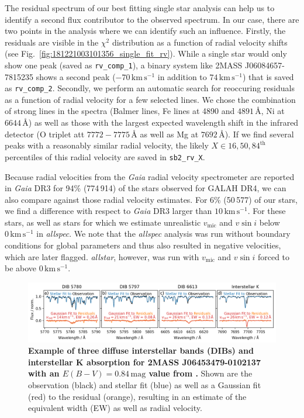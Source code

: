\documentclass[
  journal=pasa,
  manuscript=research-paper, %
  year=2023,
  volume=37
]{cup-journal}
\newcommand{\vmic}{$v_\mathrm{mic}$\xspace}
\newcommand{\vsini}{$v \sin i$\xspace}
\newcommand{\Gaia}{\textit{Gaia}\xspace}
\begin{document}
The residual spectrum of our best fitting single star analysis can help us to identify a second flux contributor to the observed spectrum. In our case, there are two points in the analysis where we can identify such an influence. Firstly, the residuals are visible in the $\chi^2$ distribution as a function of radial velocity shifts (see Fig.~\ref{fig:181221003101356_single_fit_rv}). While a single star would only show one peak (saved as \texttt{rv\_comp\_1}), a binary system like 2MASS J06084657-7815235 shows a second peak ($-70\,\mathrm{km\,s^{-1}}$ in addition to $74\,\mathrm{km\,s^{-1}}$) that is saved as \texttt{rv\_comp\_2}. Secondly, we perform an automatic search for reoccuring residuals as a function of radial velocity for a few selected lines. We chose the combination of strong lines in the spectra (Balmer lines, Fe lines at 4890 and $4891\,\text{\AA}$, Ni at $6644\,\text{\AA}$) as well as those with the largest expected wavelength shift in the infrared detector (O triplet att $7772-7775\,\text{\AA}$ as well as Mg at $7692\,\text{\AA}$). If we find several peaks with a reasonably similar radial velocity, the likely $X \in {16,50,84}^\text{th}$ percentiles of this radial velocity are saved in \texttt{sb2\_rv\_X}.

Because radial velocities from the \Gaia radial velocity spectrometer \citep{Katz2022} are reported in \Gaia DR3 for 94\% (774\,914) of the stars observed for GALAH DR4, we can also compare against those radial velocity estimates. For 6\% (50\,577) of our stars, we find a difference with respect to \Gaia DR3 larger than $10\,\mathrm{km\,s^{-1}}$. For these stars, as well as stars for which we estimate unrealistic \vmic and \vsini below $0\,\mathrm{km\,s^{-1}}$ in \textit{allspec}. We note that the \textit{allspec} analysis was run without boundary conditions for global parameters and thus also resulted in negative velocities, which are later flagged. \textit{allstar}, however, was run with \vmic and \vsini forced to be above $0\,\mathrm{km\,s^{-1}}$.


\begin{figure}[ht]
 \centering
 \includegraphics[width=\textwidth]{figures/example_dibs_06453479-0102137.png}
 \caption{\textbf{Example of three diffuse interstellar bands (DIBs) and interstellar K absorption for 2MASS J06453479-0102137 with an $E(B-V) = 0.84\,\mathrm{mag}$ value from \citet{Schlegel1998}.} Shown are the observation (black) and stellar fit (blue) as well as a Gaussian fit (red) to the residual (orange), resulting in an estimate of the equivalent width (EW) as well as radial velocity.} %
 \label{fig:example_dibs_06453479-0102137}
\end{figure}
\end{document}
